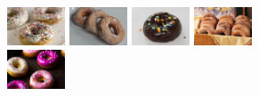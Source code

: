 \documentclass[10pt]{article}
\begin{document}
\begin{figure}[H]
				\vspace{5pt}
				\begin{subfigure}[b]{1.025\textwidth}
					\includegraphics[width=0.19\textwidth]{images/data/donut/donut116.jpg}
					\includegraphics[width=0.19\textwidth]{images/data/donut/donut155.jpg}
					\includegraphics[width=0.19\textwidth]{images/data/donut/donut176.jpg}
					\includegraphics[width=0.19\textwidth]{images/data/donut/donut205.jpg}
					\includegraphics[width=0.19\textwidth]{images/data/donut/donut440.jpg}
				\end{subfigure}


\end{figure}
\end{document}
